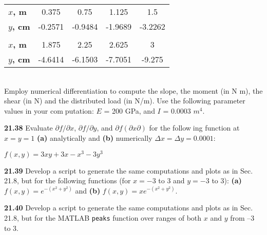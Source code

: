 \begin{multicols}{2}
\begin{tabular}{lcccc}
	\textbf{$x$, m} \; 0 &  0.375 & 0.75 & 1.125 & 1.5\\

	\textbf{$y$, cm} \; 0 & -0.2571 & -0.9484 & -1.9689 & -3.2262\\
	
	\vspace{}\\
	
	\textbf{$x$, m} & 1.875 & 2.25 & 2.625 & 3\\
	
	\textbf{$y$, cm} & -4.6414 & -6.1503 & -7.7051 & -9.275\\

\hline
\end{tabular}\\
Employ numerical differentiation to compute the slope, the
moment (in N m), the shear (in N) and the distributed load
(in N/m). Use the following parameter values in your computation: $E$ = 200 GPa, and $I$ = 0.0003 $m^4$.

\textbf{21.38} Evaluate $ \partial f/ \partial x $, $ \partial f / \partial y $, and $ \partial f (\partial x \partial ) $ for the following function at $x=y=1$ \textbf{(a)} analytically and \textbf{(b)} numerically $ \Delta x = \Delta y = 0.0001 $:

$ f(x,y) =3xy + 3x - x^3 - 3y^3 $

\textbf{21.39} Develop a script to generate the same computations
and plots as in Sec. 21.8, but for the following functions (for $ x= -3$ to 3 and $y = -3$ to 3): \textbf{(a)} $f(x,y) = e^{-(x^2+y^2)}$ and \textbf{(b)} $f(x,y) = xe^{ -(x^2+y^2) }$.

\textbf{21.40} Develop a script to generate the same computations
and plots as in Sec. 21.8, but for the MATLAB \texttt{peaks}
function over ranges of both $x$ and $y$ from –3 to 3.









\end{multicols}






	
	
	
	


